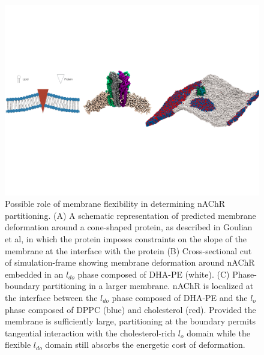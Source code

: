 \begin{figure}[t!]
	\includegraphics[width=1\linewidth]{./F31/Curvature4.pdf}
	\caption{Possible role of membrane flexibility in determining nAChR partitioning. (A) A schematic representation of predicted membrane deformation around a cone-shaped protein, as described in Goulian et al, \cite{Goulian1996} in which the protein imposes constraints on the slope of the membrane at the interface with the protein (B) Cross-sectional cut of simulation-frame showing membrane deformation around nAChR embedded in an $l_{do}$ phase composed of DHA-PE (white). (C) Phase-boundary partitioning in a larger membrane. nAChR is localized at the interface between the $l_{do}$ phase composed of DHA-PE and the $l_o$ phase composed of DPPC (blue) and cholesterol (red). Provided the membrane is sufficiently large, partitioning at the boundary permits tangential interaction with the cholesterol-rich $l_o$ domain while the flexible $l_{do}$ domain still absorbs the energetic cost of deformation.}
	\label{fig:deform}
\end{figure}

